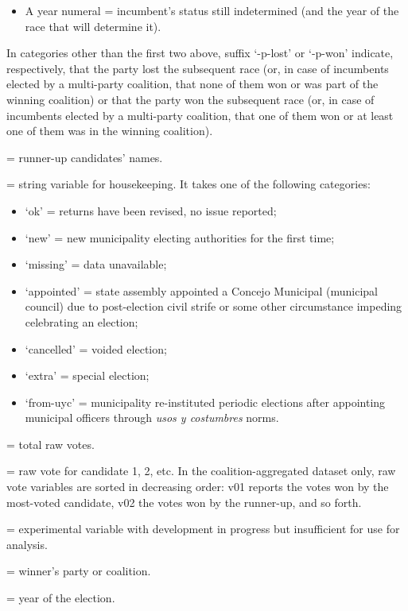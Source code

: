 \documentclass[letter,12pt]{article}
\begin{document}
\begin{singlespace}
\begin{description}
\begin{itemize}
  \item A year numeral = incumbent's status still indetermined (and the year of the race that will determine it).
  \end{itemize}
In categories other than the first two above, suffix `-p-lost' or `-p-won' indicate, respectively, that the party lost the subsequent race (or, in case of incumbents elected by a multi-party coalition, that none of them won or was part of the winning coalition) or that the party won the subsequent race (or, in case of incumbents elected by a multi-party coalition, that one of them won or at least one of them was in the winning coalition).
\item[runnerup] = runner-up candidates' names.
\item[status] = string variable for housekeeping. It takes one of the following categories:
  \begin{itemize}
  \item `ok' = returns have been revised, no issue reported;
  \item `new' = new municipality electing authorities for the first time;
  \item `missing' = data unavailable;
  \item `appointed' = state assembly appointed a Concejo Municipal (municipal council) due to post-election civil strife or some other circumstance impeding celebrating an election;
  \item `cancelled' = voided election;
  \item `extra' = special election;
  \item `from-uyc' = municipality re-instituted periodic elections after appointing municipal officers through \emph{usos y costumbres} norms.
  \end{itemize}
\item[tot] = total raw votes.
\item[v01, v02, ...] = raw vote for candidate 1, 2, etc. In the coalition-aggregated dataset only, raw vote variables are sorted in decreasing order: v01 reports the votes won by the most-voted candidate, v02 the votes won by the runner-up, and so forth.
\item[who] = experimental variable with development in progress but insufficient for use for analysis.
\item[win] = winner's party or coalition.
\item[yr] = year of the election.
\end{description}


\newpage




\end{singlespace}
\end{document}
